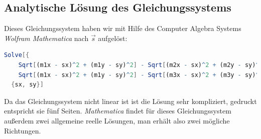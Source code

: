 \subsection{Analytische Lösung des Gleichungssystems}
Dieses Gleichungssystem haben wir mit Hilfe des Computer Algebra Systems \textit{Wolfram Mathematica}\cite{mathematica} nach $\vec{s}$ aufgelöst:
\begin{lstlisting}[language=Mathematica,caption={Befehl um das Gleichungsystem in \textit{Mathematica} zu lösen}]
  Solve[{
    Sqrt[(m1x - sx)^2 + (m1y - sy)^2] - Sqrt[(m2x - sx)^2 + (m2y - sy)^2] = dx12,
    Sqrt[(m1x - sx)^2 + (m1y - sy)^2] - Sqrt[(m3x - sx)^2 + (m3y - sy)^2] = dx13,}
  {sx, sy}]
\end{lstlisting}
Da das Gleichungssystem nicht linear ist ist die Lösung sehr kompliziert, gedruckt entspricht sie fünf Seiten. \textit{Mathematica} findet für dieses Gleichungssystem außerdem zwei allgemeine reelle Lösungen, man erhält also zwei mögliche Richtungen.
